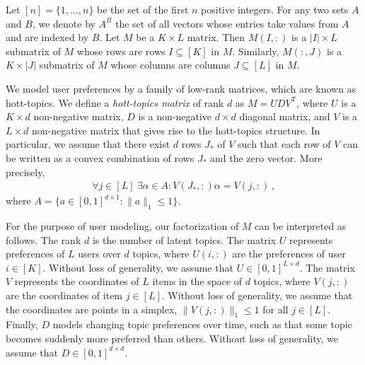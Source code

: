 
\newcommand{\transpose}{^\mathsf{\scriptscriptstyle T}}

Let $[n] = \{1, \dots, n\}$ be the set of the first $n$ positive integers. For any two sets $A$ and $B$, we denote by $A^B$ the set of all vectors whose entries take values from $A$ and are indexed by $B$. Let $M$ be a $K \times L$ matrix. Then $M(I, :)$ is a $|I| \times L$ submatrix of $M$ whose rows are rows $I \subseteq [K]$ in $M$. Similarly, $M(:, J)$ is a $K \times |J|$ submatrix of $M$ whose columns are columns $J \subseteq [L]$ in $M$.

We model user preferences by a family of low-rank matrices, which are known as hott-topics. We define a \emph{hott-topics matrix} of rank $d$ as $M = U D V\transpose$, where $U$ is a $K \times d$ non-negative matrix, $D$ is a non-negative $d \times d$ diagonal matrix, and $V$ is a $L \times d$ non-negative matrix that gives rise to the hott-topics structure. In particular, we assume that there exist $d$ rows $J_\ast$ of $V$ such that each row of $V$ can be written as a convex combination of rows $J_\ast$ and the zero vector. More precisely,
\begin{align}
  \forall j \in [L] \ \exists \alpha \in A: V(J_\ast, :) \alpha = V(j, :)\,,
  \label{eq:hott-topics}
\end{align}
where $A = \{a \in [0, 1]^{d \times 1}: \|a\|_1 \leq 1\}$.

For the purpose of user modeling, our factorization of $M$ can be interpreted as follows. The rank $d$ is the number of latent topics. The matrix $U$ represents preferences of $L$ users over $d$ topics, where $U(i, :)$ are the preferences of user $i \in [K]$. Without loss of generality, we assume that $U \in [0, 1]^{L \times d}$. The matrix $V$ represents the coordinates of $L$ items in the space of $d$ topics, where $V(j, :)$ are the coordinates of item $j \in [L]$. Without loss of generality, we assume that the coordinates are points in a simplex, $\|V(j, :)\|_1 \leq 1$ for all $j \in [L]$. Finally, $D$ models changing topic preferences over time, such as that some topic becomes suddenly more preferred than others. Without loss of generality, we assume that $D \in [0, 1]^{d \times d}$.

